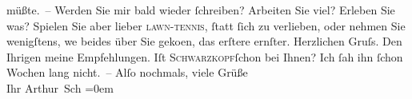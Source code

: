 \begin{ledgroupsized}[t]{13cm}
               müßte. – Werden Sie mir bald wieder ſchreiben? Arbeiten Sie viel? Erleben {\pb}Sie was? Spielen Sie aber lieber \textsc{lawn-tennis}, ſtatt ſich zu verlieben, oder nehmen Sie wenigſtens, we{\geminationn} beides über Sie geko{\geminationm}en,
               das erſtere ernſter.\pend
           \pstart
           Herzlichen Gruſs. Den Ihrigen meine Empfehlungen. Iſt \textsc{Schwarzkopf}ſchon bei Ihnen? Ich ſah ihn ſchon Wochen lang
               nicht. –\pend
           \pstart
           Alſo nochmals, viele Grüße{\\[\baselineskip]}Ihr \spacefill\mbox{Arthur Sch}\pend
           \leftskip=0em{}
         
         \endnumbering{}\end{ledgroupsized}  \newcommand{\dateiname}{L00025}\newcommand{\titel}{Arthur Schnitzler an Hugo von Hofmannsthal, 27. 7. 1891}\newcommand{\editorInnen}{Martin Anton Müller und Gerd-Hermann Susen}
      